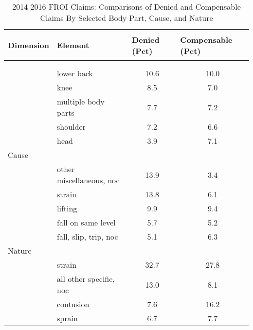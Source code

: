 \documentclass[9pt, oneside]{article}   	%
\begin{document}
\begin{longtable}{llcc}
  \caption{2014-2016 FROI Claims: Comparisons of Denied and Compensable Claims By Selected Body Part, Cause, and Nature}\\
  \label{Table: Compare}
\hline
  \toprule


    Dimension  & Element	&	 \multicolumn{1}{l}{Denied (Pct)} & \multicolumn{1}{l}{Compensable (Pct)} \\
  \midrule\\ [-1\normalbaselineskip]\hline\endhead\hline\endfoot
      \multicolumn{1}{l}{Body.Part} &  & & \\
          & lower back & 10.6  & 10.0 \\
          & knee  & 8.5   & 7.0 \\
          & multiple body parts & 7.7   & 7.2 \\
          & shoulder & 7.2   & 6.6 \\
          & head  & 3.9   & 7.1 \\
    \multicolumn{1}{l}{Cause} &       &       &  \\
          & other miscellaneous, noc & 13.9  & 3.4 \\
          & strain & 13.8  & 6.1 \\
          & lifting & 9.9   & 9.4 \\
          & fall on same level & 5.7   & 5.2 \\
          & fall, slip, trip, noc & 5.1   & 6.3 \\
    \multicolumn{1}{l}{Nature} &       &       &  \\
          & strain & 32.7  & 27.8 \\
          & all other specific, noc & 13.0  & 8.1 \\
          & contusion & 7.6   & 16.2 \\
          & sprain & 6.7   & 7.7 \\
\cline{1-1} \cline{2-2} \cline{3-3}  %
\hline 
\end{longtable}
  

  
  


  
  \pagebreak
  
  
  
  
\end{document}
